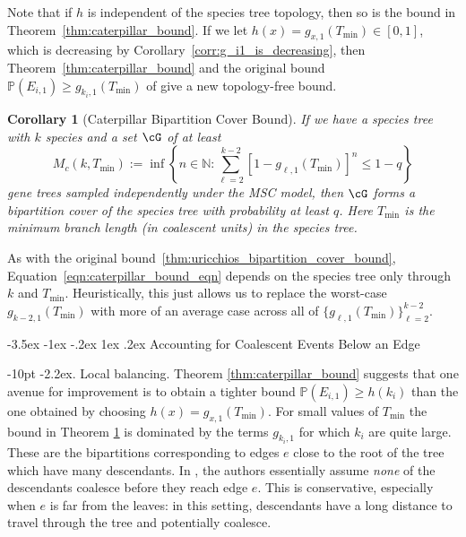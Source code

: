 \documentclass[10pt,oneside,reqno]{article}
\makeatletter
\theoremstyle{plain}
\newtheorem{corollary}[theorem]{Corollary}
\theoremstyle{definition}
\numberwithin{equation}{section}
\def\subsection#1{\@startsection {subsection}{2}{0pt}%
{-3.5ex \@plus -1ex \@minus -.2ex}%
{1ex \@plus.2ex}%
{\bf\mathversion{bold}}{#1}}
\def\subsubsection#1{\@startsection{subsubsection}{3}{0pt}%
{\medskipamount}%
{-10pt}%
{\normalsize\itshape}{\kern-2.2ex. #1.}}
\renewcommand{\leq}{\leqslant}
\renewcommand{\geq}{\geqslant}
\newcommand{\N}{\mathbb{N}}
\renewcommand{\P}{\mathbb{P}}
\makeatother
\begin{document}
\noindent Note that if $h$ is independent of the species tree topology, 
then so is the bound in Theorem~\ref{thm:caterpillar_bound}. If we let 
$h(x) = g_{x,1}(T_{\mathrm{min}}) \in [0,1]$, which is decreasing by Corollary~\ref{corr:g_i1_is_decreasing},
 then Theorem~\ref{thm:caterpillar_bound} and the original bound $\P(E_{i,1}) \geq g_{k_i,1}(T_{\mathrm{min}})$ 
 of \citet{uricchio2016_bipartition_cover} give a new topology-free bound.

\begin{corollary}[Caterpillar Bipartition Cover Bound]
If we have a species tree with $k$ species and a set $\cG$ of at least
%
\begin{equation}
    M_c(k, T_{\mathrm{min}}):=  \inf\left\{n \in \N : \sum_{\ell=2}^{k-2}\left[1-g_{\ell,1 }(T_{\mathrm{min}})\right]^n \leq 1-q\right\}
    \label{eqn:caterpillar_bound_eqn}
\end{equation}
%
\noindent gene trees sampled independently under the MSC model, then $\cG$ forms a bipartition cover of the species tree with probability at least $q$. Here $T_{\mathrm{min}}$ is the minimum branch length (in coalescent units) in the species tree.
\label{cor:improved_bipartition_cover_bound_caterpillar}
\end{corollary}

\noindent As with the original bound~\ref{thm:uricchios_bipartition_cover_bound}, Equation~\eqref{eqn:caterpillar_bound_eqn} 
depends on the species tree only through $k$ and $T_{\mathrm{min}}$. Heuristically, this just 
allows us to replace the worst-case $g_{k-2, 1}(T_{\mathrm{min}})$ with more of an 
average case across all of $\{g_{\ell, 1}(T_{\mathrm{min}})\}_{\ell = 2}^{k-2}.$ 

\subsection{Accounting for Coalescent Events Below an Edge}
\label{sec:coalescent-events-below-edge}

\subsubsection{Local balancing} Theorem \ref{thm:caterpillar_bound} suggests that one avenue for improvement is to
obtain a tighter bound $\P(E_{i,1}) \geq h(k_i)$ than the one obtained by choosing $h(x) = g_{x,1}(T_{\mathrm{min}})$.
For small values of $T_{\mathrm{min}}$ the bound in Theorem \ref{cor:improved_bipartition_cover_bound_caterpillar}
is dominated by the terms $g_{k_i,1}$ for which $k_i$ are quite large. These are the bipartitions
 corresponding to edges $e$ close to the root of the tree which have many descendants. In \citet{uricchio2016_bipartition_cover}, 
 the authors essentially assume \textit{none} of the descendants coalesce before they reach edge $e$. This is conservative, especially when $e$ is far from the leaves:
  in this setting, descendants have a long distance to travel through the tree and potentially coalesce.
\end{document}
